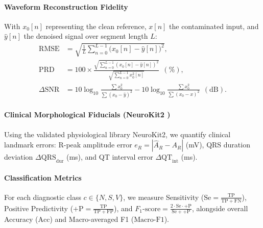 \paragraph*{Waveform Reconstruction Fidelity}
With $x_0[n]$ representing the clean reference, $x[n]$ the contaminated input, and $\hat{y}[n]$ the denoised signal over segment length $L$:
\begin{align}
\mathrm{RMSE} &= \sqrt{\frac{1}{L} \sum_{n=0}^{L-1} \big(x_0[n] - \hat{y}[n]\big)^2}, \\
\mathrm{PRD}  &= 100 \times \frac{\sqrt{\sum_{n=0}^{L-1} (x_0[n] - \hat{y}[n])^2}}{\sqrt{\sum_{n=0}^{L-1} x_0^2[n]}}\ \ (\%), \\
\Delta\mathrm{SNR} &= 10\log_{10}\frac{\sum x_0^2}{\sum (x_0 - \hat{y})^2} - 10\log_{10}\frac{\sum x_0^2}{\sum (x_0 - x)^2}\ \ (\mathrm{dB}).
\end{align}

\paragraph*{Clinical Morphological Fiducials (NeuroKit2 \cite{makowski2021})}
Using the validated physiological library NeuroKit2, we quantify clinical landmark errors: R-peak amplitude error $e_R = |\hat{A}_R - A_R|$ (mV), QRS duration deviation $\Delta\mathrm{QRS}_{\mathrm{dur}}$ (ms), and QT interval error $\Delta\mathrm{QT}_{\mathrm{int}}$ (ms).

\paragraph*{Classification Metrics}
For each diagnostic class $c \in \{N, S, V\}$, we measure Sensitivity ($\mathrm{Se} = \frac{\mathrm{TP}}{\mathrm{TP} + \mathrm{FN}}$), Positive Predictivity ($+\mathrm{P} = \frac{\mathrm{TP}}{\mathrm{TP} + \mathrm{FP}}$), and $F_1\text{-score} = \frac{2 \cdot \mathrm{Se} \cdot {+\mathrm{P}}}{\mathrm{Se} + {+\mathrm{P}}}$, alongside overall Accuracy ($\mathrm{Acc}$) and Macro-averaged F1 ($\mathrm{Macro\text{-}F1}$).
